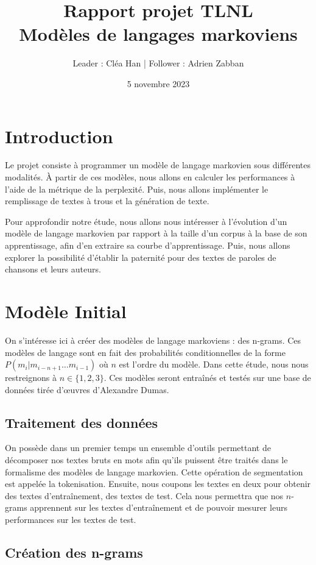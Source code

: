 \documentclass[a4paper]{article}
\title{Rapport projet TLNL \\ Modèles de langages markoviens}
\author{Leader : Cléa Han | Follower : Adrien Zabban}
\date{5 novembre 2023}
\begin{document}
\maketitle

\section{Introduction}
 
Le projet consiste à programmer un modèle de langage markovien sous différentes modalités. À partir de ces modèles, nous 
allons en calculer les performances à l'aide de la métrique de la perplexité. Puis, nous allons implémenter le remplissage 
de textes à trous et la génération de texte. 

Pour approfondir notre étude, nous allons nous intéresser à l'évolution d'un modèle de langage markovien par rapport à la 
taille d'un corpus à la base de son apprentissage, afin d'en extraire sa courbe d'apprentissage. Puis, nous allons explorer 
la possibilité d'établir la paternité pour des textes de paroles de chansons et leurs auteurs. 

\section{Modèle Initial}

On s'intéresse ici à créer des modèles de langage markoviens : des n-grams. Ces modèles de langage sont en fait des probabilités 
conditionnelles de la forme $P(m_i|m_{i-n+1} \dots m_{i-1})$ où $n$ est l'ordre du modèle. Dans cette étude, nous nous 
restreignons à $n\in \{1, 2, 3\}$. Ces modèles seront entraînés et testés sur une base de données tirée d'\oe uvres d'Alexandre Dumas.

\subsection{Traitement des données}

On possède dans un premier temps un ensemble d'outils permettant de décomposer nos textes bruts en mots afin qu'ils puissent 
être traités dans le formalisme des modèles de langage markovien.
Cette opération de segmentation est appelée la tokenisation. Ensuite, nous coupons les textes en deux pour obtenir des textes d'entraînement, 
des textes de test. Cela nous permettra que nos $n$-grams apprennent sur les textes d'entraînement et de pouvoir mesurer leurs
performances sur les textes de test.

\subsection{Création des n-grams} 
\end{document}
